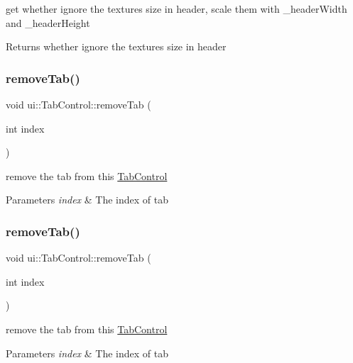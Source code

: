 get whether ignore the textures\textquotesingle{} size in header, scale them with \+\_\+header\+Width and \+\_\+header\+Height \begin{DoxyReturn}{Returns}
whether ignore the textures\textquotesingle{} size in header 
\end{DoxyReturn}
\mbox{\label{classui_1_1TabControl_a57d2ed03c45a39c9bb706da085f82ba0}} 
\subsubsection{\texorpdfstring{remove\+Tab()}{removeTab()}\hspace{0.1cm}{\footnotesize\ttfamily [1/2]}}
{\footnotesize\ttfamily void ui\+::\+Tab\+Control\+::remove\+Tab (\begin{DoxyParamCaption}\item[{int}]{index }\end{DoxyParamCaption})}

remove the tab from this \hyperlink{classui_1_1TabControl}{Tab\+Control} 
\begin{DoxyParams}{Parameters}
{\em index} & The index of tab \\
\hline
\end{DoxyParams}
\mbox{\label{classui_1_1TabControl_a57d2ed03c45a39c9bb706da085f82ba0}} 
\subsubsection{\texorpdfstring{remove\+Tab()}{removeTab()}\hspace{0.1cm}{\footnotesize\ttfamily [2/2]}}
{\footnotesize\ttfamily void ui\+::\+Tab\+Control\+::remove\+Tab (\begin{DoxyParamCaption}\item[{int}]{index }\end{DoxyParamCaption})}

remove the tab from this \hyperlink{classui_1_1TabControl}{Tab\+Control} 
\begin{DoxyParams}{Parameters}
{\em index} & The index of tab \\
\hline
\end{DoxyParams}
\mbox{\label{classui_1_1TabControl_afd8f0b327792d7a5a91359c135459b4c}} 
